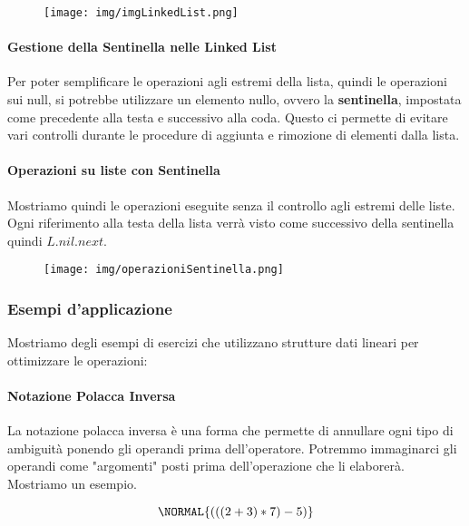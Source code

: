 \documentclass{article}
\begin{document}
\begin{figure}[htbp]
    \center
    \texttt{[image: img/imgLinkedList.png]}
\end{figure}

\newpage

\paragraph{Gestione della Sentinella nelle Linked List} Per poter semplificare le operazioni agli estremi della lista, quindi le operazioni sui null, si potrebbe utilizzare un elemento nullo, ovvero la \textbf{sentinella}, impostata come precedente alla testa e successivo alla coda. Questo ci permette di evitare vari controlli durante le procedure di aggiunta e rimozione di elementi dalla lista.

\paragraph{Operazioni su liste con Sentinella} Mostriamo quindi le operazioni eseguite senza il controllo agli estremi delle liste. Ogni riferimento alla testa della lista verrà visto come successivo della sentinella quindi $L.nil.next$.

\begin{figure}[htbp]
    \center
    \texttt{[image: img/operazioniSentinella.png]}
\end{figure}

\newpage

\subsubsection{Esempi d'applicazione} Mostriamo degli esempi di esercizi che utilizzano strutture dati lineari per ottimizzare le operazioni:

\paragraph{Notazione Polacca Inversa} La notazione polacca inversa è una forma che permette di annullare ogni tipo di ambiguità ponendo gli operandi prima dell'operatore. Potremmo immaginarci gli operandi come "argomenti" posti prima dell'operazione che li elaborerà. Mostriamo un esempio.

\begin{equation}
\NORMAL{(((2+3)*7)-5)}
\end{equation}
\end{document}
